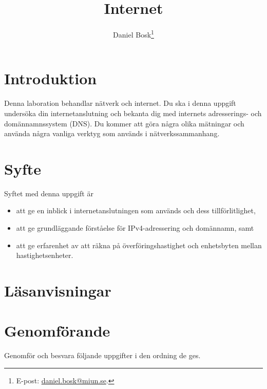 \documentclass[11pt,a4paper]{miunasgn}
\title{Internet}
\author{Daniel Bosk\footnote{%
	E-post: \href{mailto:daniel.bosk@miun.se}{daniel.bosk@miun.se}.
}}
\date{\svnId}
\begin{document}
\maketitle
\thispagestyle{foot}
\tableofcontents


\section{Introduktion}
\label{sec:Introduktion}
\noindent
Denna laboration behandlar nätverk och internet.
Du ska i denna uppgift undersöka din internetanslutning och bekanta dig med
internets adresserings- och domännamnssystem (DNS).
Du kommer att göra några olika mätningar och använda några vanliga verktyg som 
används i nätverkssammanhang.


\section{Syfte}
\label{sec:Syfte}
\noindent
Syftet med denna uppgift är
\begin{itemize}
		\item att ge en inblick i internetanslutningen som används och dess
		tillförlitlighet,
    \item att ge grundläggande förståelse för IPv4-adressering och domännamn,
		samt
	\item att ge erfarenhet av att räkna på överföringshastighet och
		enhetsbyten mellan hastighetsenheter.
\end{itemize}


\section{Läsanvisningar}
\label{sec:Lasanvisningar}
\noindent



\section{Genomförande}
\label{sec:Genomforande}
\noindent
Genomför och besvara följande uppgifter i den ordning de ges.
\end{document}
